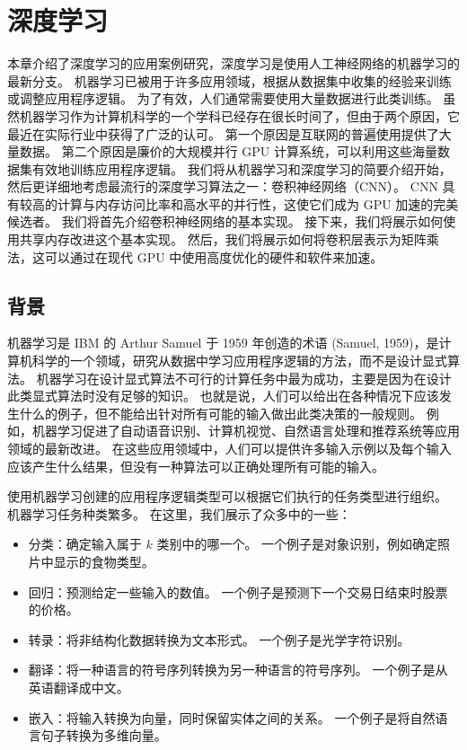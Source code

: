 \section{深度学习}
本章介绍了深度学习的应用案例研究，深度学习是使用人工神经网络的机器学习的最新分支。 机器学习已被用于许多应用领域，根据从数据集中收集的经验来训练或调整应用程序逻辑。 为了有效，人们通常需要使用大量数据进行此类训练。 虽然机器学习作为计算机科学的一个学科已经存在很长时间了，但由于两个原因，它最近在实际行业中获得了广泛的认可。 第一个原因是互联网的普遍使用提供了大量数据。 第二个原因是廉价的大规模并行 GPU 计算系统，可以利用这些海量数据集有效地训练应用程序逻辑。 我们将从机器学习和深度学习的简要介绍开始，然后更详细地考虑最流行的深度学习算法之一：卷积神经网络（CNN）。 CNN 具有较高的计算与内存访问比率和高水平的并行性，这使它们成为 GPU 加速的完美候选者。 我们将首先介绍卷积神经网络的基本实现。 接下来，我们将展示如何使用共享内存改进这个基本实现。 然后，我们将展示如何将卷积层表示为矩阵乘法，这可以通过在现代 GPU 中使用高度优化的硬件和软件来加速。

\subsection{背景}
机器学习是 IBM 的 Arthur Samuel 于 1959 年创造的术语 (Samuel, 1959)，是计算机科学的一个领域，研究从数据中学习应用程序逻辑的方法，而不是设计显式算法。 机器学习在设计显式算法不可行的计算任务中最为成功，主要是因为在设计此类显式算法时没有足够的知识。 也就是说，人们可以给出在各种情况下应该发生什么的例子，但不能给出针对所有可能的输入做出此类决策的一般规则。 例如，机器学习促进了自动语音识别、计算机视觉、自然语言处理和推荐系统等应用领域的最新改进。 在这些应用领域中，人们可以提供许多输入示例以及每个输入应该产生什么结果，但没有一种算法可以正确处理所有可能的输入。

使用机器学习创建的应用程序逻辑类型可以根据它们执行的任务类型进行组织。 机器学习任务种类繁多。 在这里，我们展示了众多中的一些：

\begin{itemize}
   \item 分类：确定输入属于 $k$ 类别中的哪一个。 一个例子是对象识别，例如确定照片中显示的食物类型。

   \item 回归：预测给定一些输入的数值。 一个例子是预测下一个交易日结束时股票的价格。

   \item 转录：将非结构化数据转换为文本形式。 一个例子是光学字符识别。

   \item 翻译：将一种语言的符号序列转换为另一种语言的符号序列。 一个例子是从英语翻译成中文。

   \item 嵌入：将输入转换为向量，同时保留实体之间的关系。 一个例子是将自然语言句子转换为多维向量。

\end{itemize}


